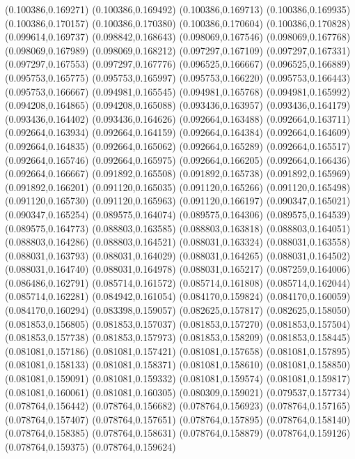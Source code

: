 (0.100386,0.169271)
(0.100386,0.169492)
(0.100386,0.169713)
(0.100386,0.169935)
(0.100386,0.170157)
(0.100386,0.170380)
(0.100386,0.170604)
(0.100386,0.170828)
(0.099614,0.169737)
(0.098842,0.168643)
(0.098069,0.167546)
(0.098069,0.167768)
(0.098069,0.167989)
(0.098069,0.168212)
(0.097297,0.167109)
(0.097297,0.167331)
(0.097297,0.167553)
(0.097297,0.167776)
(0.096525,0.166667)
(0.096525,0.166889)
(0.095753,0.165775)
(0.095753,0.165997)
(0.095753,0.166220)
(0.095753,0.166443)
(0.095753,0.166667)
(0.094981,0.165545)
(0.094981,0.165768)
(0.094981,0.165992)
(0.094208,0.164865)
(0.094208,0.165088)
(0.093436,0.163957)
(0.093436,0.164179)
(0.093436,0.164402)
(0.093436,0.164626)
(0.092664,0.163488)
(0.092664,0.163711)
(0.092664,0.163934)
(0.092664,0.164159)
(0.092664,0.164384)
(0.092664,0.164609)
(0.092664,0.164835)
(0.092664,0.165062)
(0.092664,0.165289)
(0.092664,0.165517)
(0.092664,0.165746)
(0.092664,0.165975)
(0.092664,0.166205)
(0.092664,0.166436)
(0.092664,0.166667)
(0.091892,0.165508)
(0.091892,0.165738)
(0.091892,0.165969)
(0.091892,0.166201)
(0.091120,0.165035)
(0.091120,0.165266)
(0.091120,0.165498)
(0.091120,0.165730)
(0.091120,0.165963)
(0.091120,0.166197)
(0.090347,0.165021)
(0.090347,0.165254)
(0.089575,0.164074)
(0.089575,0.164306)
(0.089575,0.164539)
(0.089575,0.164773)
(0.088803,0.163585)
(0.088803,0.163818)
(0.088803,0.164051)
(0.088803,0.164286)
(0.088803,0.164521)
(0.088031,0.163324)
(0.088031,0.163558)
(0.088031,0.163793)
(0.088031,0.164029)
(0.088031,0.164265)
(0.088031,0.164502)
(0.088031,0.164740)
(0.088031,0.164978)
(0.088031,0.165217)
(0.087259,0.164006)
(0.086486,0.162791)
(0.085714,0.161572)
(0.085714,0.161808)
(0.085714,0.162044)
(0.085714,0.162281)
(0.084942,0.161054)
(0.084170,0.159824)
(0.084170,0.160059)
(0.084170,0.160294)
(0.083398,0.159057)
(0.082625,0.157817)
(0.082625,0.158050)
(0.081853,0.156805)
(0.081853,0.157037)
(0.081853,0.157270)
(0.081853,0.157504)
(0.081853,0.157738)
(0.081853,0.157973)
(0.081853,0.158209)
(0.081853,0.158445)
(0.081081,0.157186)
(0.081081,0.157421)
(0.081081,0.157658)
(0.081081,0.157895)
(0.081081,0.158133)
(0.081081,0.158371)
(0.081081,0.158610)
(0.081081,0.158850)
(0.081081,0.159091)
(0.081081,0.159332)
(0.081081,0.159574)
(0.081081,0.159817)
(0.081081,0.160061)
(0.081081,0.160305)
(0.080309,0.159021)
(0.079537,0.157734)
(0.078764,0.156442)
(0.078764,0.156682)
(0.078764,0.156923)
(0.078764,0.157165)
(0.078764,0.157407)
(0.078764,0.157651)
(0.078764,0.157895)
(0.078764,0.158140)
(0.078764,0.158385)
(0.078764,0.158631)
(0.078764,0.158879)
(0.078764,0.159126)
(0.078764,0.159375)
(0.078764,0.159624)
